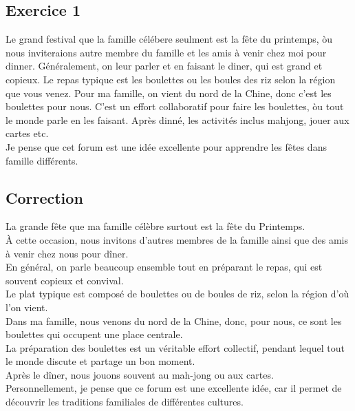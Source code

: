 \documentclass{book}
\begin{document}
        \subsection{Exercice 1}
            Le grand festival que la famille célébere seulment est la fête du printemps, 
            òu nous inviteraions autre membre du famille et les amis à venir chez moi pour dinner.
            Généralement, on leur parler et en faisant le diner, qui est grand et copieux. 
            Le repas typique est les boulettes ou les boules des riz selon la région que vous venez.
            Pour ma famille, on vient du nord de la Chine, donc c'est les boulettes pour nous.
            C'est un effort collaboratif pour faire les boulettes, òu tout le monde parle en les faisant.
            Après dinné, les activités inclus mahjong, jouer aux cartes etc. 
            \\
            Je pense que cet forum est une idée excellente pour apprendre les fêtes dans famille différents.

        \subsection*{Correction}
            La grande fête que ma famille célèbre surtout est la fête du Printemps. 
            \\
            À cette occasion, nous invitons d'autres membres de la famille ainsi que des amis à venir chez nous pour dîner.
            \\
            En général, on parle beaucoup ensemble tout en préparant le repas, qui est souvent copieux et convival.
            \\
            Le plat typique est composé de boulettes ou de boules de riz, selon la région d'où l'on vient.
            \\
            Dans ma famille, nous venons du nord de la Chine, donc, pour nous, ce sont les boulettes qui occupent une place centrale.
            \\
            La préparation des boulettes est un véritable effort collectif, pendant lequel tout le monde discute et partage un bon moment.
            \\
            Après le dîner, nous jouons souvent au mah-jong ou aux cartes.
            \\
            Personnellement, je pense que ce forum est une excellente idée, car il permet de découvrir les traditions familiales de différentes cultures.
            
\end{document}
